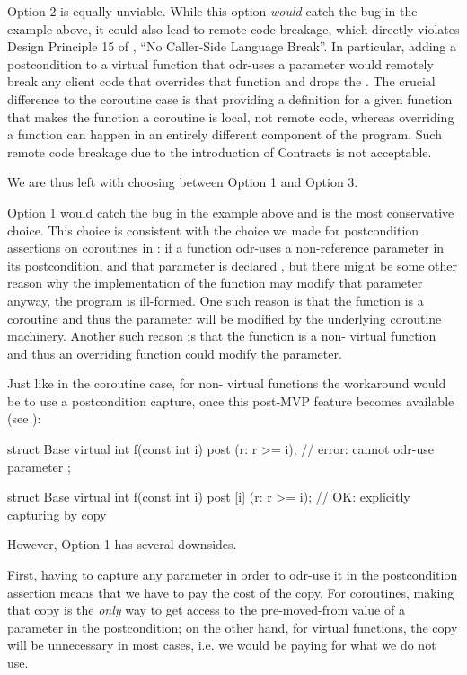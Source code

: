 Option 2 is equally unviable. While this option \emph{would} catch the bug in the example above, it could also lead to remote code breakage, which directly violates Design Principle 15 of \cite{P2900R10}, ``No Caller-Side Language Break''. In particular, adding a postcondition to a virtual function that odr-uses a  parameter would remotely break any client code that overrides that function and drops the . The crucial difference to the coroutine case is that providing a definition for a given function that makes the function a coroutine is local, not remote code, whereas overriding a function can happen in an entirely different component of the program. Such remote code breakage due to the introduction of Contracts is not acceptable.

We are thus left with choosing between Option 1 and Option 3.

Option 1 would catch the bug in the example above and is the most conservative choice. This choice is consistent with the choice we made for postcondition assertions on coroutines in \cite{P2900R10}: if a function odr-uses a non-reference parameter in its postcondition, and that parameter is declared , but there might be some other reason why the implementation of the function may modify that parameter anyway, the program is ill-formed. One such reason is that the function is a coroutine and thus the parameter will be modified by the underlying coroutine machinery. Another such reason is that the function is a non- virtual function and thus an overriding function could modify the parameter.

Just like in the coroutine case, for non- virtual functions the workaround would be to use a postcondition capture, once this post-MVP feature becomes available (see \cite{P3098R0}):
\begin{codeblock}
struct Base {
  virtual int f(const int i) post (r: r >= i);     // error: cannot odr-use parameter  
};

struct Base {
  virtual int f(const int i) post [i] (r: r >= i); // OK: explicitly capturing  by copy
}
\end{codeblock}

However, Option 1 has several downsides.

First, having to capture any parameter in order to odr-use it in the postcondition assertion means that we have to pay the cost of the copy. For coroutines, making that copy is the \emph{only} way to get access to the pre-moved-from value of a parameter in the postcondition; on the other hand, for virtual functions, the copy will be unnecessary in most cases, i.e. we would be paying for what we do not use.

